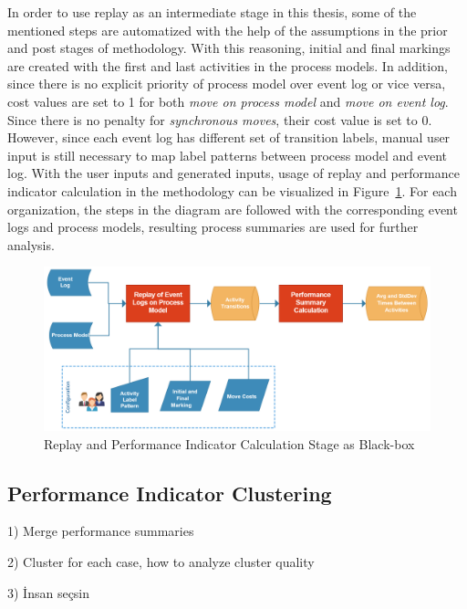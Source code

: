 In order to use replay as an intermediate stage in this thesis, some of the mentioned steps are automatized with the help of the assumptions in the prior and post stages of methodology. With this reasoning, initial and final markings are created with the first and last activities in the process models. In addition, since there is no explicit priority of process model over event log or vice versa, cost values are set to 1 for both \textit{move on process model} and \textit{move on event log}. Since there is no penalty for \textit{synchronous moves}, their cost value is set to 0. However, since each event log has different set of transition labels, manual user input is still necessary to map label patterns between process model and event log. With the user inputs and generated inputs, usage of replay and performance indicator calculation in the methodology can be visualized in Figure~\ref{fig:replay-and-performance-indicator-calculation}. For each organization, the steps in the diagram are followed with the corresponding event logs and process models, resulting process summaries are used for further analysis.

\begin{figure}
  \centering
  \includegraphics[width=\textwidth]{4_methodology/replay-and-performance-indicator-calculation}
  \caption{Replay and Performance Indicator Calculation Stage as Black-box}
  \label{fig:replay-and-performance-indicator-calculation}
\end{figure}

\subsection{Performance Indicator Clustering}
\label{subsec:performance-indicator-clustering}

1)	Merge performance summaries
	
2)	Cluster for each case, how to analyze cluster quality

3) İnsan seçsin

